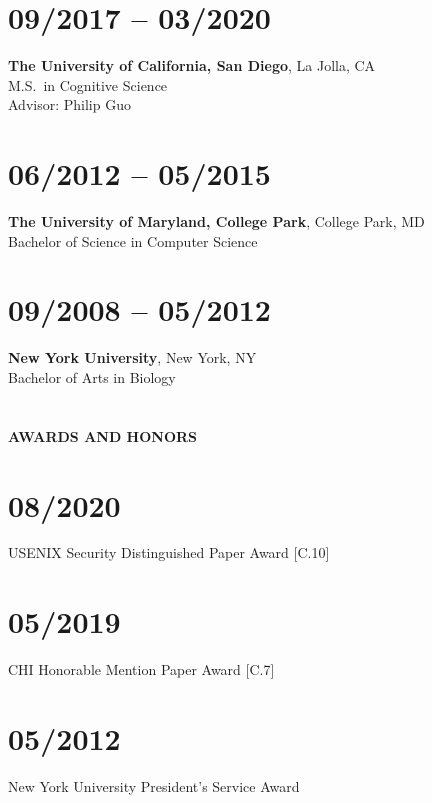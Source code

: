 \section{09/2017 -- 03/2020}

\textbf{The University of California, San Diego}, La Jolla, CA \\
M.S.\ in Cognitive Science \\
Advisor: Philip Guo

\section{06/2012 -- 05/2015}

\textbf{The University of Maryland, College Park}, College Park, MD \\ Bachelor
of Science in Computer Science

\section{09/2008 -- 05/2012}

\textbf{New York University}, New York, NY \\
Bachelor of Arts in Biology

\section{} \vspace{0.1in} \textbf{AWARDS AND HONORS} \vspace{-0.05in}

\section{08/2020} USENIX Security Distinguished Paper Award [C.10]

\section{05/2019} CHI Honorable Mention Paper Award [C.7]

\section{05/2012} New York University President's Service Award


